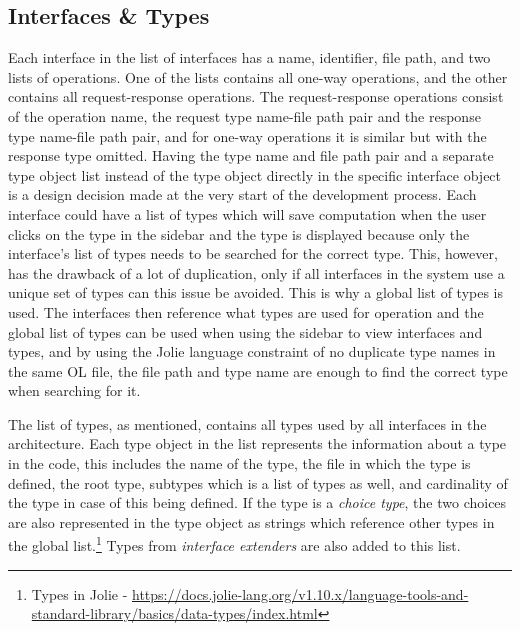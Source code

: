 \subsection{Interfaces \& Types}
Each interface in the list of interfaces has a name, identifier, file path, and two lists of operations.
One of the lists contains all one-way operations, and the other contains all request-response operations.
The request-response operations consist of the operation name, the request type name-file path pair and the response type name-file path pair, and for one-way operations it is similar but with the response type omitted.
Having the type name and file path pair and a separate type object list instead of the type object directly in the specific interface object is a design decision made at the very start of the development process.
Each interface could have a list of types which will save computation when the user clicks on the type in the sidebar and the type is displayed because only the interface's list of types needs to be searched for the correct type.
This, however, has the drawback of a lot of duplication, only if all interfaces in the system use a unique set of types can this issue be avoided.
This is why a global list of types is used. The interfaces then reference what types are used for operation and the global list of types can be used when using the sidebar to view interfaces and types, and by
using the Jolie language constraint of no duplicate type names in the same OL file, the file path and type name are enough to find the correct type when searching for it.

The list of types, as mentioned, contains all types used by all interfaces in the architecture.
Each type object in the list represents the information about a type in the code, this includes the name of the type, the file in which the type is defined, the root type, subtypes which is a list of types as well, and cardinality of the type in case of this being defined.
If the type is a \textit{choice type}, the two choices are also represented in the type object as strings which reference other types in the global list.\footnote{Types in Jolie - \url{https://docs.jolie-lang.org/v1.10.x/language-tools-and-standard-library/basics/data-types/index.html}}
Types from \textit{interface extenders} are also added to this list.

